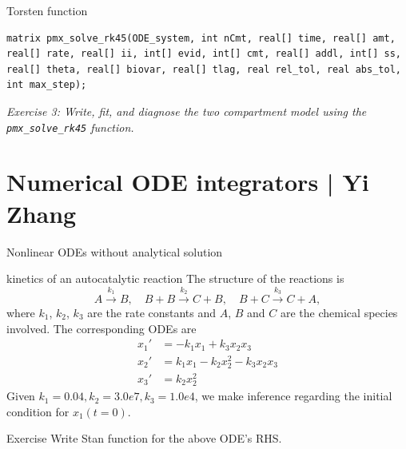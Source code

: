 \documentclass[presentation, allowframebreaks]{beamer}
\begin{document}
\begin{frame}[fragile,label={sec:org2b7f5c0}]{Torsten function}
 \begin{verbatim}
matrix pmx_solve_rk45(ODE_system, int nCmt, real[] time, real[] amt, real[] rate, real[] ii, int[] evid, int[] cmt, real[] addl, int[] ss, real[] theta, real[] biovar, real[] tlag, real rel_tol, real abs_tol, int max_step);
\end{verbatim}
\emph{\textcolor{MRGGreen}{Exercise 3}: Write, fit, and diagnose the two compartment model using the \texttt{pmx\_solve\_rk45} function.}
\end{frame}

\section{Numerical ODE integrators | \footnotesize{Yi Zhang}}
\label{sec:org80ef0e0}

\begin{frame}[label={sec:org99fa0f4}]{Nonlinear ODEs without analytical solution}
\begin{block}{kinetics of an autocatalytic reaction \cite{robertson_numerical_1966}}
The structure of the reactions is 
\begin{equation*}
A \xrightarrow{k_1} B,\quad
B+B \xrightarrow{k_2} C + B,\quad
B+C \xrightarrow{k_3} C + A,
\end{equation*}
where \(k_1\), \(k_2\), \(k_3\) are the rate
constants and \(A\), \(B\) and \(C\) are the chemical species
involved. The corresponding ODEs are
\begin{align*}
x_1' &= -k_1x_1 + k_3x_2x_3\\
x_2' &=  k_1x_1 - k_2x_2^2 - k_3x_2x_3\\
x_3' &=  k_2x_2^2
\end{align*}
Given \(k_1=0.04, k_2=3.0e7, k_3=1.0e4\), we make inference
regarding the initial condition for \(x_1(t=0)\).
\end{block}
\begin{block}{Exercise}
Write Stan function for the above ODE's RHS.
\end{block}
\end{frame}
\end{document}
